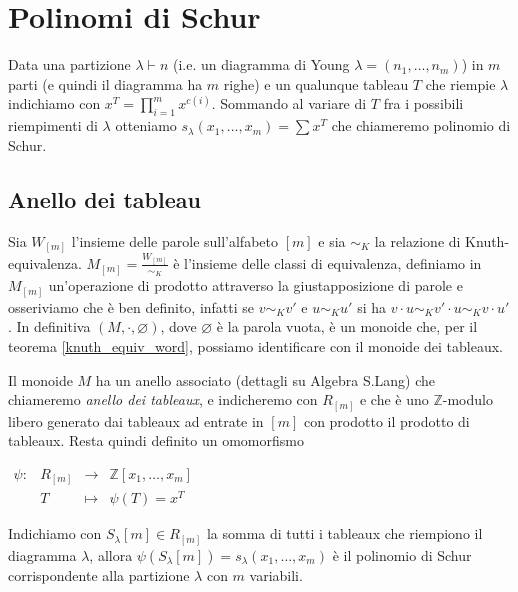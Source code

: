\chapter{Polinomi di Schur}

\begin{defn}
Data una partizione $\lambda \vdash n$ (i.e. un diagramma di Young
$\lambda = (n_1, \ldots, n_m)$) in $m$ parti (e quindi il diagramma ha
$m$ righe) e un qualunque tableau $T$ che riempie $\lambda$ indichiamo
con $x^T = \prod\limits_{i = 1}^m x^{c(i)}$. Sommando al variare di
$T$ fra i possibili riempimenti di $\lambda$ otteniamo
\begin{math}
s_\lambda(x_1,\ldots,x_m) = \sum x^T
\end{math}
che chiameremo polinomio di Schur.
\end{defn}

\section{Anello dei tableau}

Sia $W_{[m]}$ l'insieme delle parole sull'alfabeto $[m]$ e sia
$\sim_K$ la relazione di Knuth-equivalenza. $M_{[m]} =
\frac{W_{[m]}}{\sim_K}$ \`e l'insieme delle classi di equivalenza,
definiamo in $M_{[m]}$ un'operazione di prodotto attraverso la giustapposizione di parole e
osseriviamo che \`e ben definito, infatti se $v \sim_K v'$ e $u \sim_K
u'$ si ha $v \cdot u \sim_K v' \cdot u \sim_K v \cdot u'$. In
definitiva $(M, \cdot, \varnothing)$, dove $\varnothing$ \`e la
parola vuota, \`e un monoide che, per il
teorema \eqref{knuth_equiv_word}, possiamo identificare con il monoide
dei tableaux.

Il monoide $M$ ha un anello associato (dettagli su Algebra
S.Lang) che chiameremo \emph{anello dei tableaux}, e indicheremo con
$R_{[m]}$ e che \`e uno $\mathbb{Z}$-modulo libero generato dai
tableaux ad entrate in $[m]$ con prodotto il prodotto di tableaux.
Resta quindi definito un omomorfismo
\begin{center}
\begin{math}
\begin{matrix}
\psi: & R_{[m]} & \rightarrow  & \mathbb{Z}[x_1,\ldots,x_m]\\
& T      & \mapsto & \psi(T)=x^T
\end{matrix}
\end{math}
\end{center}
Indichiamo con $S_\lambda[m] \in R_{[m]}$ la somma di tutti i tableaux
che riempiono il diagramma $\lambda$, allora
$\psi(S_\lambda[m])=s_\lambda(x_1,\ldots,x_m)$ \`e il polinomio di
Schur corrispondente alla partizione $\lambda$ con $m$ variabili.

